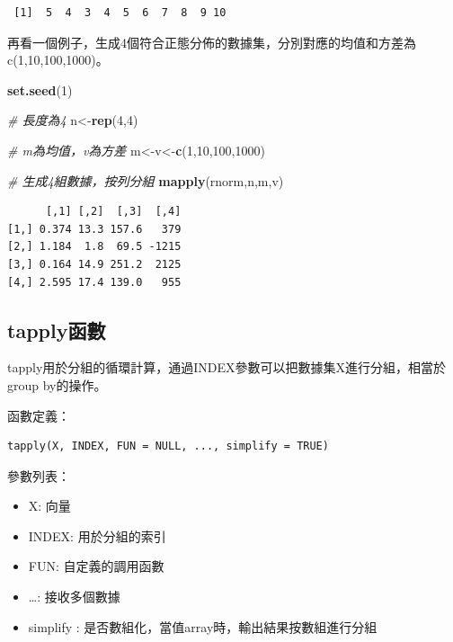 \documentclass[]{book}
\newenvironment{Shaded}{\begin{snugshade}}{\end{snugshade}}
\newcommand{\CommentTok}[1]{\textcolor[rgb]{0.56,0.35,0.01}{\textit{#1}}}
\newcommand{\DecValTok}[1]{\textcolor[rgb]{0.00,0.00,0.81}{#1}}
\newcommand{\KeywordTok}[1]{\textcolor[rgb]{0.13,0.29,0.53}{\textbf{#1}}}
\newcommand{\NormalTok}[1]{#1}
\providecommand{\tightlist}{%
  \setlength{\itemsep}{0pt}\setlength{\parskip}{0pt}}
\theoremstyle{definition}
\theoremstyle{definition}
\theoremstyle{definition}
\theoremstyle{remark}
\begin{document}
\begin{verbatim}
 [1]  5  4  3  4  5  6  7  8  9 10
\end{verbatim}

再看一個例子，生成4個符合正態分佈的數據集，分別對應的均值和方差為c(1,10,100,1000)。

\begin{Shaded}
\begin{Highlighting}[]
\KeywordTok{set.seed}\NormalTok{(}\DecValTok{1}\NormalTok{)}

\CommentTok{# 長度為4}
\NormalTok{n<-}\KeywordTok{rep}\NormalTok{(}\DecValTok{4}\NormalTok{,}\DecValTok{4}\NormalTok{)}

\CommentTok{# m為均值，v為方差}
\NormalTok{m<-v<-}\KeywordTok{c}\NormalTok{(}\DecValTok{1}\NormalTok{,}\DecValTok{10}\NormalTok{,}\DecValTok{100}\NormalTok{,}\DecValTok{1000}\NormalTok{)}

\CommentTok{# 生成4組數據，按列分組}
\KeywordTok{mapply}\NormalTok{(rnorm,n,m,v)}
\end{Highlighting}
\end{Shaded}

\begin{verbatim}
      [,1] [,2]  [,3]  [,4]
[1,] 0.374 13.3 157.6   379
[2,] 1.184  1.8  69.5 -1215
[3,] 0.164 14.9 251.2  2125
[4,] 2.595 17.4 139.0   955
\end{verbatim}

\hypertarget{tapply}{%
\subsection{tapply函數}\label{tapply}}

tapply用於分組的循環計算，通過INDEX參數可以把數據集X進行分組，相當於group
by的操作。

函數定義：

\begin{verbatim}
tapply(X, INDEX, FUN = NULL, ..., simplify = TRUE)
\end{verbatim}

參數列表：

\begin{itemize}
\tightlist
\item
  X: 向量
\item
  INDEX: 用於分組的索引
\item
  FUN: 自定義的調用函數
\item
  \ldots{}: 接收多個數據
\item
  simplify : 是否數組化，當值array時，輸出結果按數組進行分組
\end{itemize}
\end{document}
